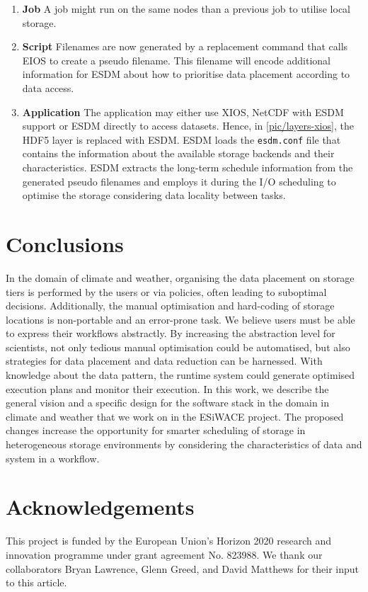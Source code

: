 \documentclass{superfri}
\newcommand{\bnl}[1]{\textcolor{green}{BNL: #1}}
\begin{document}
\begin{enumerate}
  \item \textbf{Job}
  A job might run on the same nodes than a previous job to utilise local storage.

  \item \textbf{Script}
  Filenames are now generated by a replacement command that calls EIOS to create a pseudo filename.
  This filename will encode additional information for ESDM about how to prioritise data placement according to data access.

  \item \textbf{Application}
  The application may either use XIOS, NetCDF with ESDM support or ESDM directly to access datasets.
  Hence, in \cref{pic/layers-xios}, the HDF5 layer is replaced with ESDM.
  ESDM loads the \texttt{esdm.conf} file that contains the information about the available storage backends and their characteristics.
  ESDM extracts the long-term schedule information from the generated pseudo filenames and employs it during the I/O scheduling to optimise the storage considering data locality between tasks.

\end{enumerate}

\section{Conclusions}
\label{sec:conclusions}

In the domain of climate and weather, organising the data placement on storage tiers is performed by the users or via policies, often leading to suboptimal decisions.
Additionally, the manual optimisation and hard-coding of storage locations is non-portable and an error-prone task.
We believe users must be able to express their workflows abstractly.
By increasing the abstraction level for scientists, not only tedious manual optimisation could be automatised, but also strategies for data placement and data reduction can be harnessed.
With knowledge about the data pattern, the runtime system could generate optimised execution plans and monitor their execution.
In this work, we describe the general vision and a specific design for the software stack in the domain in climate and weather that we work on in the ESiWACE project.
The proposed changes increase the opportunity for smarter scheduling of storage in heterogeneous storage environments by considering the characteristics of data and system in a workflow.

\section*{Acknowledgements}

\small
This project is funded by the European Union's Horizon 2020 research and innovation programme under grant agreement No. 823988.
We thank our collaborators Bryan Lawrence, Glenn Greed, and David Matthews for their input to this article.

\openaccess


\end{document}

